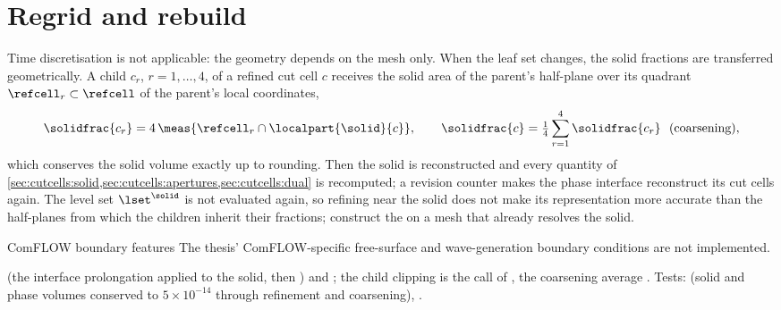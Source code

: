 \section{Regrid and rebuild}\label{sec:cutcells:time}
Time discretisation is not applicable: the geometry depends on the mesh only.
When the leaf set changes, the solid fractions are transferred geometrically.
A child $c_r$, $r=1,\dots,4$, of a refined cut cell $c$ receives the solid
area of the parent's half-plane over its quadrant $\refcell_r\subset\refcell$
of the parent's local coordinates,
\begin{equation}\label{eq:cutcells:prolong}
  \solidfrac{c_r}=4\,\meas{\refcell_r\cap\localpart{\solid}{c}},\qquad
  \solidfrac{c}=\tfrac14\sum_{r=1}^{4}\solidfrac{c_r}\ \ \text{(coarsening)},
\end{equation}
which conserves the solid volume exactly up to rounding. Then the solid is
reconstructed and every quantity of
\cref{sec:cutcells:solid,sec:cutcells:apertures,sec:cutcells:dual} is
recomputed; a revision counter makes the phase interface reconstruct its
cut cells again. The level set $\lset^{\solid}$ is not evaluated again, so
refining near the solid does not make its representation more accurate than
the half-planes from which the children inherit their fractions; construct
the  on a mesh that already resolves the solid.

\begin{deviation}{ComFLOW boundary features}
The thesis' ComFLOW-specific free-surface and wave-generation boundary
conditions are not implemented.
\end{deviation}

\begin{implnote}
 (the interface
prolongation applied to the solid, then ) and
; the child clipping is the call of
, the
coarsening average .
Tests:
(solid and phase volumes conserved to $5\times10^{-14}$ through refinement and
coarsening),
.
\end{implnote}
